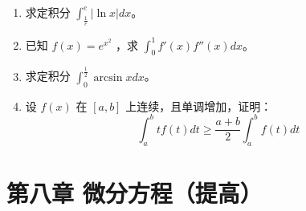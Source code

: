 \documentclass[12pt, a4paper]{article}
\begin{document}
\begin{enumerate}
    \item 求定积分 $ \int_{\frac{1}{e}}^{e}|\ln x|dx $。

    \item 已知 $ f(x) = e^{x^{2}} $ ，求 $ \int_{0}^{1} f'(x) f''(x) dx $。

    \item 求定积分 $ \int_{0}^{\frac{1}{2}}\arcsin x dx $。

    \item 设 $ f(x) $ 在 $ [a,b] $ 上连续，且单调增加，证明：
    $$ \int_{a}^{b}tf(t)dt\geq\frac{a+b}{2}\int_{a}^{b}f(t)dt $$
\end{enumerate}

\section*{第八章 微分方程（提高）}
\end{document}
